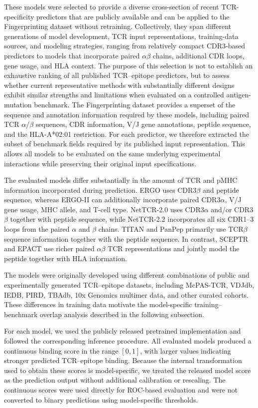 \documentclass{article}
\begin{document}
These models were selected to provide a diverse cross-section of recent
TCR-specificity predictors that are publicly available and can be applied
to the Fingerprinting dataset without retraining. Collectively, they span
different generations of model development, TCR input representations,
training-data sources, and modeling strategies, ranging from relatively
compact CDR3-based predictors to models that incorporate paired
$\alpha\beta$ chains, additional CDR loops, gene usage, and HLA context.
The purpose of this selection is not to establish an exhaustive ranking of
all published TCR--epitope predictors, but to assess whether current
representative methods with substantially different designs exhibit similar
strengths and limitations when evaluated on a controlled antigen-mutation
benchmark.
The Fingerprinting dataset provides a superset of the sequence and annotation
information required by these models, including paired TCR $\alpha/\beta$
sequences, CDR information, V/J gene annotations, peptide sequence, and the
HLA-A*02:01 restriction. For each predictor, we therefore extracted the
subset of benchmark fields required by its published input representation.
This allows all models to be evaluated on the same underlying experimental
interactions while preserving their original input specifications.

The evaluated models differ substantially in the amount of TCR and pMHC
information incorporated during prediction. ERGO uses CDR3$\beta$ and peptide
sequence, whereas ERGO-II can additionally incorporate paired
CDR3$\alpha$, V/J gene usage, MHC allele, and T-cell type. NetTCR-2.0 uses
CDR3$\alpha$ and/or CDR3$\beta$ together with peptide sequence, while
NetTCR-2.2 incorporates all six CDR1--3 loops from the paired
$\alpha$ and $\beta$ chains. TITAN and PanPep primarily use TCR$\beta$
sequence information together with the peptide sequence. In contrast,
SCEPTR and EPACT use richer paired $\alpha\beta$ TCR representations and
jointly model the peptide together with HLA information.

The models were originally developed using different combinations of public
and experimentally generated TCR--epitope datasets, including McPAS-TCR,
VDJdb, IEDB, PIRD, TBAdb, 10x Genomics multimer data, and other curated
cohorts. These differences in training data motivate the model-specific
training--benchmark overlap analysis described in the following subsection.

For each model, we used the publicly released pretrained implementation and
followed the corresponding inference procedure. All evaluated models produced
a continuous binding score in the range $[0,1]$, with larger values indicating
stronger predicted TCR--epitope binding. Because the internal transformation
used to obtain these scores is model-specific, we treated the released model
score as the prediction output without additional calibration or rescaling.
The continuous scores were used directly for ROC-based evaluation and were
not converted to binary predictions using model-specific thresholds.
\end{document}

